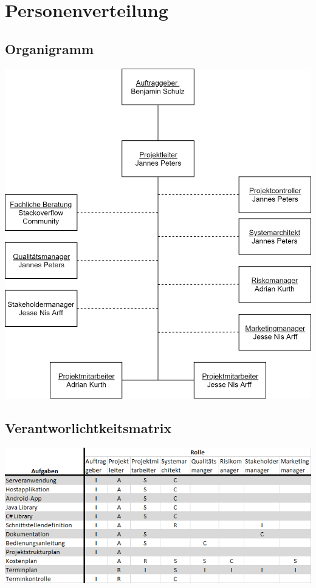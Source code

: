 \documentclass{scrartcl}
\begin{document}
\section{Personenverteilung}
\subsection{Organigramm}
\includegraphics[scale=0.3]{Organigramm.png}
\subsection{Verantworlichtkeitsmatrix}
\begin{center}
\includegraphics[scale=0.7]{RASCI.png}
\end{center}
\end{document}
